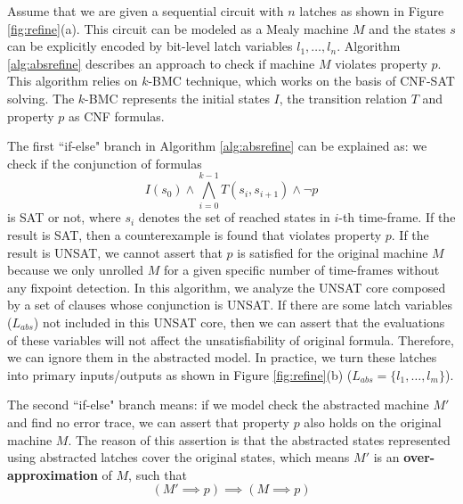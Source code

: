 \begin{figure}[hbt]
\end{figure}
Assume that we are given a sequential circuit with $n$ latches as shown in Figure \ref{fig:refine}(a). 
This circuit can be modeled as a Mealy machine $M$ and the states $s$ can be explicitly encoded by bit-level latch variables 
$l_1,\dots,l_n$. Algorithm \ref{alg:absrefine} describes an approach to check if machine $M$ violates property $p$.
This algorithm relies on $k$-BMC technique, which works on the basis of CNF-SAT solving.
The $k$-BMC represents the initial states $I$, the transition relation $T$ and property $p$ as CNF formulas.

The first ``if-else" branch in Algorithm \ref{alg:absrefine} can be
explained as: we check if the conjunction of formulas 
$$I(s_0)\land \bigwedge_{i=0}^{k-1}T(s_i,s_{i+1}) \land \neg p$$
is SAT or not, where $s_i$ denotes the set of reached states in $i$-th time-frame. If the result is
SAT, then a counterexample is found that violates property $p$. If the result is UNSAT, we cannot
assert that $p$ is satisfied for the original machine $M$ because we only unrolled $M$ for a given specific number of time-frames
without any fixpoint detection.
In this algorithm, we analyze the UNSAT core composed by a set of clauses whose conjunction is UNSAT.
If there are some latch variables ($L_{abs}$) not included in this UNSAT core, then we can assert that the evaluations of 
these variables will not affect the unsatisfiability of original formula. Therefore, we can ignore them in the abstracted model.
In practice, we turn these latches into primary inputs/outputs as shown in Figure \ref{fig:refine}(b) ($L_{abs} = \{l_1,\dots,l_m\}$).


The second ``if-else" branch means: if we model check the abstracted machine $M'$ and find no
error trace, we can assert that property $p$ also holds on the original machine $M$. The reason of this assertion is that
the abstracted states represented using abstracted latches cover the original states, which means $M'$ is an {\bf over-approximation}
of $M$, such that 
$$(M'\implies p) \implies (M\implies p)$$ 

